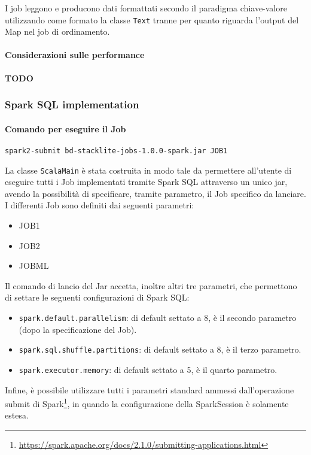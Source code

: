   I job leggono e producono dati formattati secondo il paradigma chiave-valore utilizzando come formato la classe \texttt{Text} tranne per quanto riguarda l'output del Map nel job di ordinamento.

  \paragraph{Considerazioni sulle performance}\label{par:job1:mapreduce:performance}

  \textbf{TODO}

  \subsubsection{Spark SQL implementation}\label{subsub:job1:spark}

  \paragraph{Comando per eseguire il Job}\label{par:job1:spark:cmd}

  \texttt{spark2-submit bd-stacklite-jobs-1.0.0-spark.jar JOB1}

  La classe \texttt{ScalaMain} è stata costruita in modo tale da permettere all'utente di eseguire tutti i Job implementati tramite
  Spark SQL attraverso un unico jar, avendo la possibilità di specificare, tramite parametro, il Job specifico da lanciare.
  I differenti Job sono definiti dai seguenti parametri:
  \begin{itemize}
    \item JOB1
    \item JOB2
    \item JOBML
  \end{itemize}

  Il comando di lancio del Jar accetta, inoltre altri tre parametri, che permettono di settare le seguenti configurazioni di Spark SQL\@:
  \begin{itemize}
    \item \texttt{spark.default.parallelism}: di default settato a 8, è il secondo parametro (dopo la specificazione del Job).
    \item \texttt{spark.sql.shuffle.partitions}: di default settato a 8, è il terzo parametro.
    \item \texttt{spark.executor.memory}: di default settato a 5, è il quarto parametro.
  \end{itemize}

  Infine, è possibile utilizzare tutti i parametri standard ammessi dall'operazione submit di Spark\footnote{\url{https://spark.apache.org/docs/2.1.0/submitting-applications.html}},
  in quando la configurazione della SparkSession è solamente estesa.

